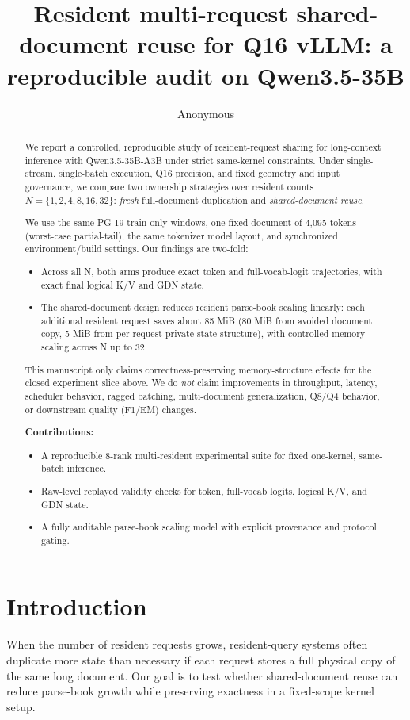 \documentclass{article}
\title{Resident multi-request shared-document reuse for Q16 vLLM: a reproducible audit on Qwen3.5-35B}
\author{Anonymous}
\date{}
\begin{document}
\maketitle

\begin{abstract}
We report a controlled, reproducible study of resident-request sharing for long-context inference with Qwen3.5-35B-A3B under strict same-kernel constraints. Under single-stream, single-batch execution, Q16 precision, and fixed geometry and input governance, we compare two ownership strategies over resident counts
$N=\{1,2,4,8,16,32\}$:
\emph{fresh} full-document duplication and
\emph{shared-document reuse}.

We use the same PG-19 train-only windows, one fixed document of 4,095 tokens (worst-case partial-tail), the same tokenizer model layout, and synchronized environment/build settings. Our findings are two-fold:
\begin{itemize}
  \item Across all N, both arms produce exact token and full-vocab-logit trajectories, with exact final logical K/V and GDN state.
  \item The shared-document design reduces resident parse-book scaling linearly: each additional resident request saves about 85 MiB (80 MiB from avoided document copy, 5 MiB from per-request private state structure), with controlled memory scaling across N up to 32.
\end{itemize}

This manuscript only claims correctness-preserving memory-structure effects for the closed experiment slice above. We do \emph{not} claim improvements in throughput, latency, scheduler behavior, ragged batching, multi-document generalization, Q8/Q4 behavior, or downstream quality (F1/EM) changes.

\textbf{Contributions:}
\begin{itemize}
  \item A reproducible 8-rank multi-resident experimental suite for fixed one-kernel, same-batch inference.
  \item Raw-level replayed validity checks for token, full-vocab logits, logical K/V, and GDN state.
  \item A fully auditable parse-book scaling model with explicit provenance and protocol gating.
\end{itemize}
\end{abstract}

\section{Introduction}
When the number of resident requests grows, resident-query systems often duplicate more state than necessary if each request stores a full physical copy of the same long document. Our goal is to test whether shared-document reuse can reduce parse-book growth while preserving exactness in a fixed-scope kernel setup.
\end{document}

